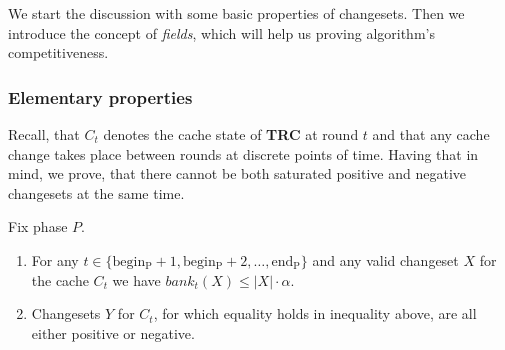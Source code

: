 We start the discussion with some basic properties of changesets. Then we 
introduce the concept of \textit{fields}, which will help us proving 
algorithm's competitiveness.

\subsubsection{Elementary properties}
Recall, that $C_t$ denotes the cache state of \textbf{TRC} at round $t$ and that 
any cache change takes place between rounds at discrete points of time. 
Having that in mind, we prove, that there cannot be both saturated 
positive and negative changesets at the same time.
\begin{lemma}
\label{thm:lemma1}
Fix phase $P$. 
\begin{enumerate}[label=(\arabic*)]
  \item For any $t \in \{\mathrm{begin_P} +1, \mathrm{begin_P} + 2, 
\ldots, \mathrm{end_P}\}$ and any valid changeset $X$ for the cache $C_t$ 
we have $bank_t(X) \leq |X| \cdot \alpha$.
  \item Changesets $Y$ for
$C_t$, for which equality holds in inequality above, are all either positive or negative.
\end{enumerate} 
\end{lemma}
